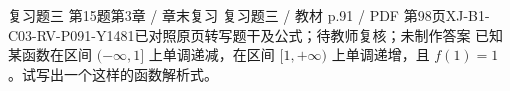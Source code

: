 \par\noindent\begin{minipage}{\linewidth}
\begin{bankitem}{复习题三 第15题}{第3章 / 章末复习 复习题三 / 教材 p.91 / PDF 第98页}{XJ-B1-C03-RV-P091-Y1481}{已对照原页转写题干及公式；待教师复核；未制作答案}
已知某函数在区间 $(-\infty,1]$ 上单调递减，在区间 $[1,+\infty)$ 上单调递增，且 $f(1)=1$。试写出一个这样的函数解析式。
\end{bankitem}
\end{minipage}\par\medskip
